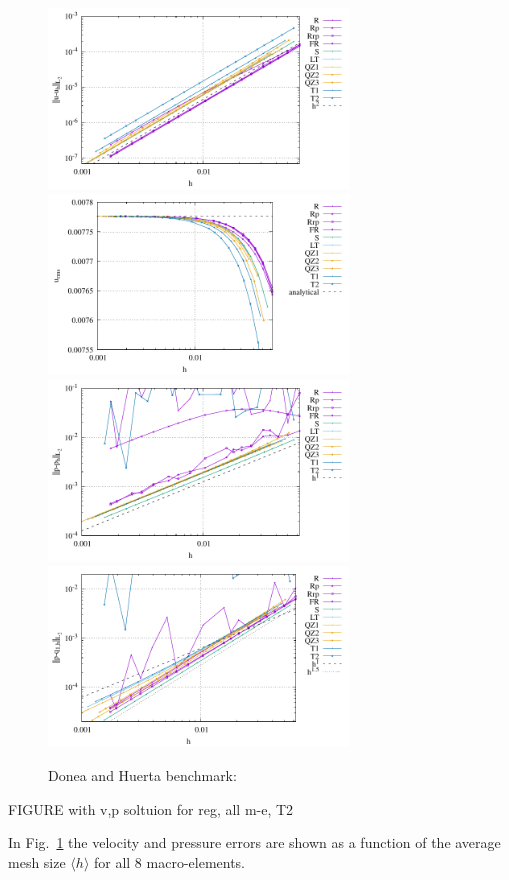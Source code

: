 \documentclass[a4paper]{article}
\begin{document}
\begin{figure}
\centering
\includegraphics[width=8cm]{../results/errors_u_exp1}
\includegraphics[width=8cm]{../results/vrms_exp1} \\
\includegraphics[width=8cm]{../results/errors_p_exp1}
\includegraphics[width=8cm]{../results/errors_q1_exp1}
\caption{Donea and Huerta benchmark:} \label{fig:resdh}
\end{figure}


{\color{red} 
FIGURE with v,p soltuion for reg, all m-e, T2}

In Fig.~\ref{fig:resdh} the velocity and pressure errors are shown as a function of the 
average mesh size $\langle h \rangle$ for all 8 macro-elements.
\end{document}
